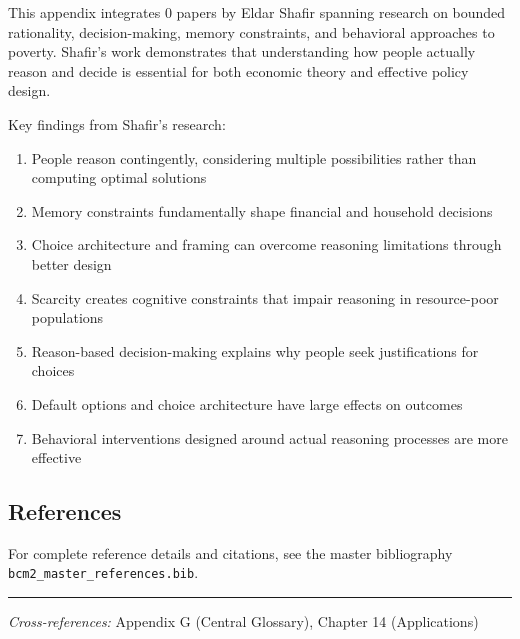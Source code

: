 This appendix integrates 0 papers by Eldar Shafir spanning research on bounded rationality, decision-making, memory constraints, and behavioral approaches to poverty. Shafir's work demonstrates that understanding how people actually reason and decide is essential for both economic theory and effective policy design.

Key findings from Shafir's research:

\begin{enumerate}
  \item People reason contingently, considering multiple possibilities rather than computing optimal solutions
  \item Memory constraints fundamentally shape financial and household decisions
  \item Choice architecture and framing can overcome reasoning limitations through better design
  \item Scarcity creates cognitive constraints that impair reasoning in resource-poor populations
  \item Reason-based decision-making explains why people seek justifications for choices
  \item Default options and choice architecture have large effects on outcomes
  \item Behavioral interventions designed around actual reasoning processes are more effective
\end{enumerate}

\subsection{References}

For complete reference details and citations, see the master bibliography
\texttt{bcm2\_master\_references.bib}.

\vspace{1em}
\hrule
\vspace{0.5em}

\noindent\textit{Cross-references:}
Appendix G (Central Glossary), Chapter 14 (Applications)
